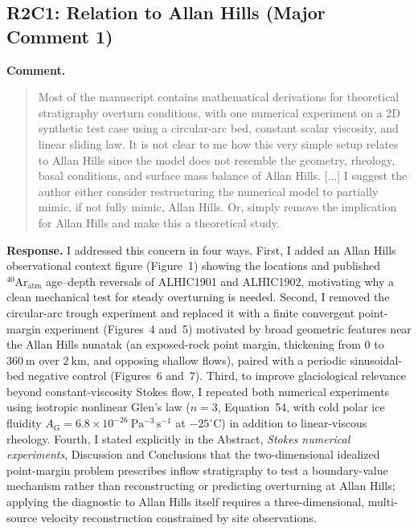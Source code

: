 \documentclass[11pt]{article}
\newcommand{\response}[1]{\noindent\textcolor{responseblue}{#1}}
\begin{document}
\subsection*{R2C1: Relation to Allan Hills (Major Comment 1)}

\noindent\textbf{Comment.}
\begin{quote}
Most of the manuscript contains mathematical derivations for theoretical stratigraphy overturn conditions, with one numerical experiment on a 2D synthetic test case using a circular-arc bed, constant scalar viscosity, and linear sliding law. It is not clear to me how this very simple setup relates to Allan Hills since the model does not resemble the geometry, rheology, basal conditions, and surface mass balance of Allan Hills. [...] I suggest the author either consider restructuring the numerical model to partially mimic, if not fully mimic, Allan Hills. Or, simply remove the implication for Allan Hills and make this a theoretical study.
\end{quote}

\response{\textbf{Response.} I addressed this concern in four ways. First, I added an Allan Hills observational context figure (Figure~1) showing the locations and published \(^{40}\mathrm{Ar}_{\mathrm{atm}}\) age--depth reversals of ALHIC1901 and ALHIC1902, motivating why a clean mechanical test for steady overturning is needed. Second, I removed the circular-arc trough experiment and replaced it with a finite convergent point-margin experiment (Figures~4 and~5) motivated by broad geometric features near the Allan Hills nunatak (an exposed-rock point margin, thickening from \(0\) to \(360~\mathrm{m}\) over \(2~\mathrm{km}\), and opposing shallow flows), paired with a periodic sinusoidal-bed negative control (Figures~6 and~7). Third, to improve glaciological relevance beyond constant-viscosity Stokes flow, I repeated both numerical experiments using isotropic nonlinear Glen's law (\(n=3\), Equation~54, with cold polar ice fluidity \(A_{\mathrm{G}}=6.8\times10^{-26}~\mathrm{Pa^{-3}\,s^{-1}}\) at \(-25^{\circ}\mathrm{C}\)) in addition to linear-viscous rheology. Fourth, I stated explicitly in the Abstract, \emph{Stokes numerical experiments}, Discussion and Conclusions that the two-dimensional idealized point-margin problem prescribes inflow stratigraphy to test a boundary-value mechanism rather than reconstructing or predicting overturning at Allan Hills; applying the diagnostic to Allan Hills itself requires a three-dimensional, multi-source velocity reconstruction constrained by site observations.}
\end{document}
